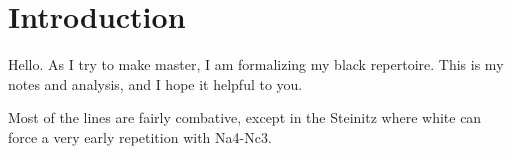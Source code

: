 \documentclass{article}
\begin{document}
\section{Introduction}
Hello. As I try to make master, I am formalizing my black repertoire.
This is my notes and analysis, and I hope it helpful to you.

Most of the lines are fairly combative, except in the Steinitz where white can 
force a very early repetition with Na4-\>Nc3.

\tableofcontents






\end{document}
